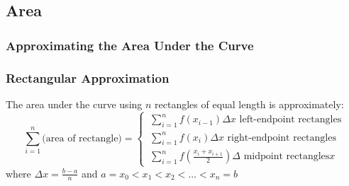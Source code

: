 \documentclass[11pt]{article}
\begin{document}
\subsection{Area}
\subsubsection{Approximating the Area Under the Curve}
\subsubsection*{Rectangular Approximation}
The area under the curve using $n$ rectangles of equal length is approximately:
\[
    \sum_{i=1}^n\text{(area of rectangle)}=
    \begin{cases}
        \,\displaystyle\sum_{i=1}^nf(x_{i-1})\Delta x\text{ left-endpoint rectangles}\\[15pt]
        \,\displaystyle\sum_{i=1}^nf(x_i)\Delta x\text{ right-endpoint rectangles}\\[15pt]
        \,\displaystyle\sum_{i=1}^nf(\frac{x_i+x_{i+1}}{2})\Delta\text{ midpoint rectangles}x
    \end{cases}
\]where $\displaystyle\Delta x=\frac{b-a}{n}$ and $a=x_0<x_1<x_2<\dots<x_n=b$
\end{document}
